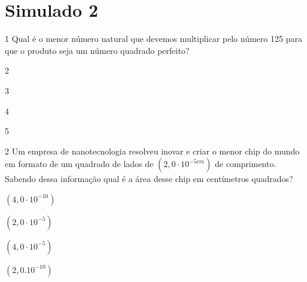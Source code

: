 \pagebreak

\section*{Simulado 2}

\num{1} Qual é o menor número natural que devemos multiplicar pelo número 125
para que o produto seja um número quadrado perfeito?

\begin{escolha}
\item 2
\item 3
\item 4
\item 5
\end{escolha}







\num{2} Um empresa de nanotecnologia resolveu inovar e criar o menor chip do
mundo em formato de um quadrado de lados de $(2,0 \cdot 10 ^{-5 cm})$ de
comprimento. Sabendo dessa informação qual é a área desse chip em centímetros quadrados?

\begin{escolha}
\item $(4,0 \cdot 10^{-10})$
\item $(2,0 \cdot 10^{-5})$
\item $(4,0 \cdot 10^{-5})$
\item $(2,0.10^{-10})$
\end{escolha}




